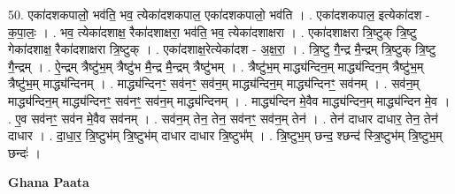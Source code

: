 \documentclass[17pt]{extarticle}
\begin{document}
50. एका॑दशकपालो॒ भव॑ति॒ भव॒ त्येका॑दशकपाल॒ एका॑दशकपालो॒ भव॑ति । . एका॑दशकपाल॒ इत्येका॑दश - क॒पा॒लः॒ । . भव॒ त्येका॑दशाक्ष॒ रैका॑दशाक्षरा॒ भव॑ति॒ भव॒ त्येका॑दशाक्षरा । . एका॑दशाक्षरा त्रि॒ष्टुक् त्रि॒ष्टु गेका॑दशाक्ष॒ रैका॑दशाक्षरा त्रि॒ष्टुक् । . एका॑दशाक्ष॒रेत्येका॑दश - अ॒क्ष॒रा॒ । . त्रि॒ष्टु गै॒न्द्र मै॒न्द्रम् त्रि॒ष्टुक् त्रि॒ष्टु गै॒न्द्रम् । . ऐ॒न्द्रम् त्रैष्टु॑भ॒म् त्रैष्टु॑भ मै॒न्द्र मै॒न्द्रम् त्रैष्टु॑भम् । . त्रैष्टु॑भ॒म् माद्ध्य॑न्दिन॒म् माद्ध्य॑न्दिन॒म् त्रैष्टु॑भ॒म् त्रैष्टु॑भ॒म् माद्ध्य॑न्दिनम् । . माद्ध्य॑न्दिनꣳ॒॒ सव॑नꣳ॒॒ सव॑न॒म् माद्ध्य॑न्दिन॒म् माद्ध्य॑न्दिनꣳ॒॒ सव॑नम् । . सव॑न॒म् माद्ध्य॑न्दिन॒म् माद्ध्य॑न्दिनꣳ॒॒ सव॑नꣳ॒॒ सव॑न॒म् माद्ध्य॑न्दिनम् । . माद्ध्य॑न्दिन मे॒वैव माद्ध्य॑न्दिन॒म् माद्ध्य॑न्दिन मे॒व । . ए॒व सव॑नꣳ॒॒ सव॑न मे॒वैव सव॑नम् । . सव॑न॒म् तेन॒ तेन॒ सव॑नꣳ॒॒ सव॑न॒म् तेन॑ । . तेन॑ दाधार दाधार॒ तेन॒ तेन॑ दाधार । . दा॒धा॒र॒ त्रि॒ष्टुभ॑म् त्रि॒ष्टुभ॑म् दाधार दाधार त्रि॒ष्टुभ᳚म् । . त्रि॒ष्टुभ॒म् छन्द॒ श्छन्द॑ स्त्रि॒ष्टुभ॑म् त्रि॒ष्टुभ॒म् छन्दः॑ । \newline

\textbf{Ghana Paata } \newline
\end{document}

